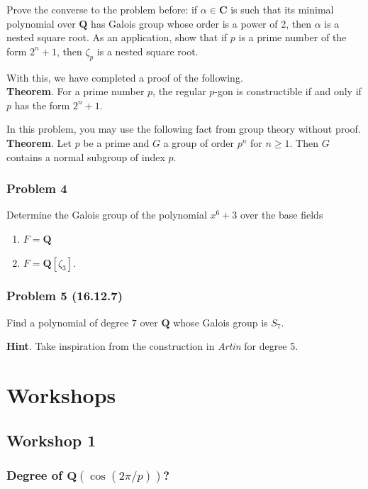 \documentclass[11pt]{article}
\begin{document}
Prove the converse to the problem before: if \(\alpha \in \mathbf{C}\) is such that its minimal polynomial over \(\mathbf{Q}\) has Galois group whose order is a power of 2, then \(\alpha\) is a nested square root.
As an application, show that if \(p\) is a prime number of the form \(2^n+1\), then \(\zeta_p\) is a nested square root.

With this, we have completed a proof of the following.\\
\textbf{Theorem}. For a prime number \(p\), the regular \(p\)-gon is constructible if and only if \(p\) has the form \(2^n+1\).

In this problem, you may use the following fact from group theory without proof. \\
\textbf{Theorem}. Let \(p\) be a prime and \(G\) a group of order \(p^{n}\) for \(n \geq 1\).  Then \(G\) contains a normal subgroup of index \(p\).
\subsubsection{Problem 4}
\label{sec:org9c72775}

Determine the Galois group of the polynomial \(x^6+3\) over the base fields
\begin{enumerate}
\item \(F = \mathbf{Q}\)
\item \(F = \mathbf{Q}[\zeta_3]\).
\end{enumerate}
\subsubsection{Problem 5 (16.12.7)}
\label{sec:org3f33786}

Find a polynomial of degree \(7\) over \(\mathbf{Q}\) whose Galois group is \(S_7\).

\textbf{Hint}. Take inspiration from the construction in \emph{Artin} for degree 5.
\section{Workshops}
\label{sec:org9b70daf}
\subsection{Workshop 1}
\label{sec:org5e20b1b}
\subsubsection{Degree of \(\mathbf{Q}(\cos (2\pi/p))\)?}
\label{sec:orgebbd09e}
\end{document}
